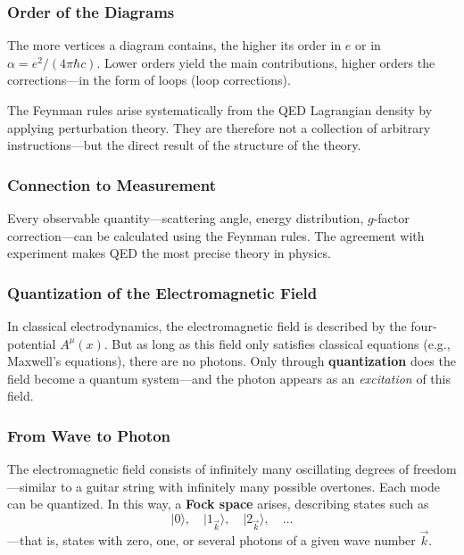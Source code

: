 \subsubsection*{Order of the Diagrams}
The more vertices a diagram contains, the higher its order in $e$ or in $\alpha = e^2 / (4\pi\hbar c)$. Lower orders yield the main contributions, higher orders the corrections—in the form of loops (loop corrections).

\vspace{1em}
\begin{tcolorbox}[didaktikbox, title=Why the Rules Work]
	\label{box:Warum die Regeln funktionieren}
	The Feynman rules arise systematically from the QED Lagrangian density by applying perturbation theory. They are therefore not a collection of arbitrary instructions—but the direct result of the structure of the theory.
\end{tcolorbox}

\subsubsection*{Connection to Measurement}
Every observable quantity—scattering angle, energy distribution, $g$-factor correction—can be calculated using the Feynman rules. The agreement with experiment makes QED the most precise theory in physics.

\subsubsection{Quantization of the Electromagnetic Field}

In classical electrodynamics, the electromagnetic field is described by the four-potential $A^\mu(x)$. But as long as this field only satisfies classical equations (e.g., Maxwell’s equations), there are no photons. Only through \textbf{quantization} does the field become a quantum system—and the photon appears as an \emph{excitation} of this field.

\subsubsection*{From Wave to Photon}
The electromagnetic field consists of infinitely many oscillating degrees of freedom—similar to a guitar string with infinitely many possible overtones. Each mode can be quantized. In this way, a \textbf{Fock space} arises, describing states such as
\[
\lvert 0 \rangle, \quad \lvert 1_{\vec{k}} \rangle, \quad \lvert 2_{\vec{k}} \rangle, \quad \dots
\]
—that is, states with zero, one, or several photons of a given wave number $\vec{k}$.

